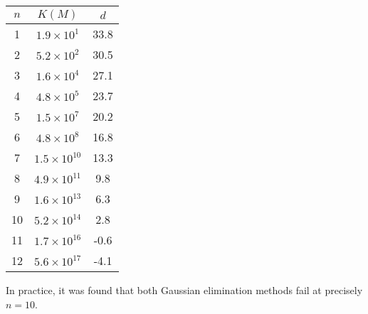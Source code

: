 \documentclass[10pt]{article}
\begin{document}
\begin{center}
\begin{tabular}{|c|c|c|}
\hline
$n$ & $K\left(M\right)$ & $d$ \\
\hline
1 & $1.9 \times 10^1$ & 33.8 \\
\hline
2 & $5.2 \times 10^2$ & 30.5 \\
\hline
3 & $1.6 \times 10^4$ & 27.1 \\
\hline
4 & $4.8 \times 10^5$ & 23.7 \\
\hline
5 & $1.5 \times 10^7$ & 20.2 \\
\hline
6 & $4.8 \times 10^8$ & 16.8 \\
\hline
7 & $1.5 \times 10^{10}$ & 13.3 \\
\hline
8 & $4.9 \times 10^{11}$ & 9.8 \\
\hline
9 & $1.6 \times 10^{13}$ & 6.3 \\
\hline
10 & $5.2 \times 10^{14}$ & 2.8 \\
\hline
11 & $1.7 \times 10^{16}$ & -0.6 \\
\hline
12 & $5.6 \times 10^{17}$ & -4.1 \\
\hline
\end{tabular}
\end{center}
\noindent In practice, it was found that both Gaussian elimination methods fail at precisely $n=10$.
\end{document}
